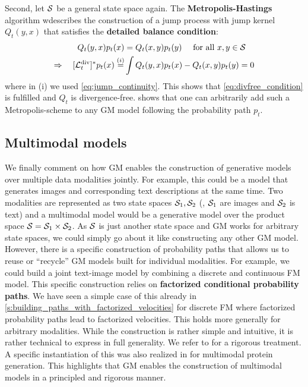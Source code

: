 \documentclass{fairmeta}
\newcommand{\highlight}[1]{{\color{metablue} \textbf{#1}}}
\numberwithin{equation}{section}
\begin{document}
Second, let ${\mathcal{S}}$ be a general state space again. The \highlight{Metropolis-Hastings} algorithm \citep{hastings1970monte} wdescribes the construction of a jump process with jump kernel $Q_t(y,x)$ that satisfies the \highlight{detailed balance condition}:
\begin{align*}
 Q_t(y,x)p_t(x) &= Q_t(x,y)p_t(y)\quad \text{ for all }x,y\in{\mathcal{S}} \\
 \Rightarrow \quad [\mathcal{L}_t^{\text{div}}]^*p_t(x) \overset{(i)}{=}& \int Q_t(y,x)p_t(x) -Q_t(x,y)p_t(y) = 0
\end{align*}
where in (i) we used \cref{eq:jump_continuity}. This shows that \cref{eq:divfree_condition} is fulfilled and $Q_t$ is divergence-free.  shows that one can arbitrarily add such a Metropolis-scheme to any GM model following the probability path $p_t$.




\pagebreak
\subsection{Multimodal models}

We finally comment on how GM enables the construction of generative models over multiple data modalities jointly. For example, this could be a model that generates images and corresponding text descriptions at the same time. Two modalities are represented as two state spaces ${\mathcal{S}}_1, {\mathcal{S}}_2$ (\eg, ${\mathcal{S}}_1$ are images and ${\mathcal{S}}_2$ is text) and a multimodal model would be a generative model over the product space ${\mathcal{S}}={\mathcal{S}}_1\times {\mathcal{S}}_2$. As ${\mathcal{S}}$ is just another state space and GM works for arbitrary state spaces, we could simply go about it like constructing any other GM model. However, there is a specific construction of probability paths that allows us to reuse or ``recycle'' GM models built for individual modalities. For example, we could build a joint text-image model by combining a discrete and continuous FM model. This specific construction relies on \highlight{factorized conditional probability paths}. We have seen a simple case of this already in \cref{s:building_paths_with_factorized_velocities} for discrete FM where factorized probability paths lead to factorized velocities. This holds more generally for arbitrary modalities. While the construction is rather simple and intuitive, it is rather technical to express in full generality. We refer to \citep{holderrieth2024gm} for a rigorous treatment. A specific instantiation of this was also realized in \citep{campbell2024generative} for multimodal protein generation. This highlights that GM enables the construction of multimodal models in a principled and rigorous manner.
\end{document}
